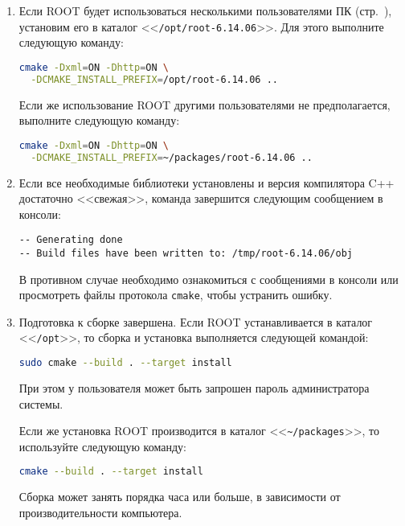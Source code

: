 \documentclass[12pt, a4paper, oneside, onecolumn]{book}
\newcommand{\ROOT}{\mbox{ROOT}}
\newcommand{\APP}[1]{\mbox{\tt #1}}
\newcommand{\DIRECTORY}[1]{<<{\tt #1}>>}
\begin{document}
\begin{enumerate}
\item 
\label{item-select-root-dir}

Если \ROOT{} будет использоваться несколькими пользователями ПК (стр.~\pageref{sec_multiuser}), установим его в каталог \DIRECTORY{/opt/root-6.14.06}. Для этого выполните  следующую команду:

\begin{lstlisting}[language=bash]
cmake -Dxml=ON -Dhttp=ON \
  -DCMAKE_INSTALL_PREFIX=/opt/root-6.14.06 ..
\end{lstlisting}

Если же использование \ROOT{} другими пользователями не предполагается, выполните следующую команду:

\begin{lstlisting}[language=bash]
cmake -Dxml=ON -Dhttp=ON \
  -DCMAKE_INSTALL_PREFIX=~/packages/root-6.14.06 ..
\end{lstlisting}

\item Если все необходимые библиотеки установлены и версия компилятора C++ достаточно <<свежая>>, команда завершится следующим сообщением в консоли:

\begin{lstlisting}
-- Generating done
-- Build files have been written to: /tmp/root-6.14.06/obj
\end{lstlisting}

В противном случае необходимо ознакомиться с сообщениями в консоли или просмотреть файлы протокола \APP{cmake}, чтобы устранить ошибку.

\item Подготовка к сборке завершена. Если \ROOT{} устанавливается в каталог \DIRECTORY{/opt}, то сборка и установка выполняется следующей командой:

\begin{lstlisting}[language=bash]
sudo cmake --build . --target install
\end{lstlisting}

При этом у пользователя может быть запрошен пароль администратора системы.

Если же установка \ROOT{} производится в каталог \DIRECTORY{\~{}/packages}, то используйте следующую команду:

\begin{lstlisting}[language=bash]
cmake --build . --target install
\end{lstlisting}
 
Сборка может занять порядка часа или больше, в зависимости от производительности компьютера.


\end{enumerate}
\end{document}
